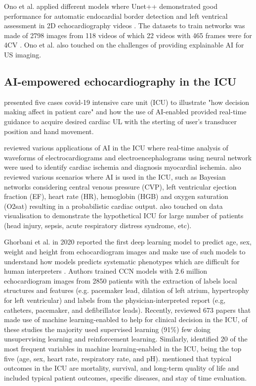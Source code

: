 \documentclass[mlabstract,twocolumn]{jmlr}
\begin{document}
Ono et al. applied different models where Unet++ demonstrated good performance for automatic endocardial border detection and left ventrical assessment in 2D echocardiography videos \citep{ono2022}.
The datasets to train networks was made of 2798 images from 118 videos of which 22 videos with 465 frames were for 4CV \citep{ono2022}.
Ono et al. also touched on the challenges of providing explainable AI for US imaging.


\subsection{AI-empowered echocardiography in the ICU}
\citet{CHEEMA2021JACCCaseReports} presented five cases covid-19 intensive care unit (ICU) to illustrate "how decision making affect in patient care" and how the use of AI-enabled provided real-time guidance to acquire desired cardiac UL with the sterting of user's transducer position and hand movement.

\citet{hanson2001} reviewed various applications of AI in the ICU where real-time analysis of waveforms of electrocardiograms and electroencephalograms using neural network were used to identify cardiac ischemia and diagnosis myocardial ischemia.
\citet{hanson2001} also reviewed various scenarios where AI is used in the ICU, such as Bayesian networks considering central venous pressure (CVP), left ventricular ejection fraction (EF), heart rate (HR), hemoglobin (HGB) and oxygen saturation (O2sat) resulting in a probabilistic cardiac output.
\citet{hanson2001} also touched on data visualisation to demonstrate the hypothetical ICU for large number of patients (head injury, sepsis, acute respiratory distress syndrome, etc).

Ghorbani et al. in 2020 reported the first deep learning model to predict age, sex, weight and height from echocardiogram images and make use of such models to understand how models predicts systematic phenotypes which are difficult for human interpreters \cite{Ghorbani-DigitalMedicineNature-JAN2020}.
Authors trained CCN models with 2.6 million echocardiogram images from 2850 patients with the extraction of labels local structures and features (e.g. pacemaker lead, dilation of left atrium, hypertrophy for left ventricular) and labels from the physician-interpreted report (e.g, catheters, pacemaker, and defibrillator leads).
Recently, \citet{hong2022} reviewed 673 papers that made use of machine learning-enabled to help for clinical decision in the ICU, of these studies the majority used supervised learning (91\%) few doing unsupervising learning and reinforcement learning.
Similarly, \citet{hong2022} identified 20 of the most frequent variables in machine learning-enabled in the ICU, being the top five (age, sex, heart rate, respiratory rate, and pH).
\citet{hong2022} mentioned that typical outcomes in the ICU are mortality, survival, and long-term quality of life and included typical patient outcomes, specific diseases, and stay of time evaluation.
\end{document}
